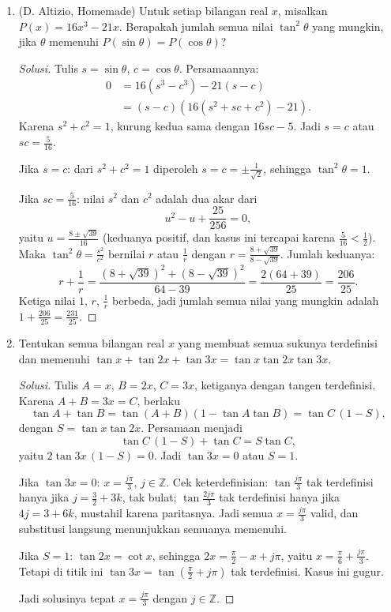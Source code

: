 \documentclass[12pt]{scrartcl}
\begin{document}
\begin{enumerate}
	\item (D. Altizio, Homemade)
	Untuk setiap bilangan real $x$, misalkan $P(x) = 16x^3-21x$.
	Berapakah jumlah semua nilai $\tan^2\theta$ yang mungkin, jika $\theta$
	memenuhi $P(\sin\theta) = P(\cos\theta)$?
	\begin{proof}[Solusi]
	Tulis $s = \sin\theta$, $c = \cos\theta$. Persamaannya:
	\begin{align*}
	0 &= 16(s^3-c^3) - 21(s-c) \\
	&= (s-c)(16(s^2+sc+c^2) - 21).
	\end{align*}
	Karena $s^2+c^2 = 1$, kurung kedua sama dengan $16sc - 5$. Jadi
	$s = c$ atau $sc = \frac{5}{16}$.

	Jika $s = c$: dari $s^2+c^2 = 1$ diperoleh $s = c = \pm\frac{1}{\sqrt{2}}$,
	sehingga $\tan^2\theta = 1$.

	Jika $sc = \frac{5}{16}$: nilai $s^2$ dan $c^2$ adalah dua akar dari
	\[ u^2 - u + \frac{25}{256} = 0, \]
	yaitu $u = \frac{8\pm\sqrt{39}}{16}$ (keduanya positif, dan kasus ini
	tercapai karena $\frac{5}{16} < \frac12$). Maka $\tan^2\theta = \frac{s^2}{c^2}$
	bernilai $r$ atau $\frac1r$ dengan $r = \frac{8+\sqrt{39}}{8-\sqrt{39}}$.
	Jumlah keduanya:
	\[ r + \frac1r = \frac{(8+\sqrt{39})^2+(8-\sqrt{39})^2}{64-39}
	= \frac{2(64+39)}{25} = \frac{206}{25}. \]
	Ketiga nilai $1$, $r$, $\frac1r$ berbeda, jadi jumlah semua nilai yang
	mungkin adalah $1 + \frac{206}{25} = \frac{231}{25}$.
	\end{proof}

	\item
	Tentukan semua bilangan real $x$ yang membuat semua sukunya terdefinisi dan
	memenuhi $\tan x + \tan 2x + \tan 3x = \tan x\tan 2x\tan 3x$.
	\begin{proof}[Solusi]
	Tulis $A = x$, $B = 2x$, $C = 3x$, ketiganya dengan tangen terdefinisi.
	Karena $A+B = 3x = C$, berlaku
	\[ \tan A + \tan B = \tan(A+B)(1-\tan A\tan B) = \tan C\,(1-S), \]
	dengan $S = \tan x\tan 2x$. Persamaan menjadi
	\[ \tan C\,(1-S) + \tan C = S\tan C, \]
	yaitu $2\tan 3x\,(1-S) = 0$. Jadi $\tan 3x = 0$ atau $S = 1$.

	Jika $\tan 3x = 0$: $x = \frac{j\pi}{3}$, $j \in \mathbb{Z}$.
	Cek keterdefinisian: $\tan\frac{j\pi}{3}$ tak terdefinisi hanya jika
	$j = \frac32 + 3k$, tak bulat; $\tan\frac{2j\pi}{3}$ tak terdefinisi hanya
	jika $4j = 3+6k$, mustahil karena paritasnya. Jadi semua $x = \frac{j\pi}{3}$
	valid, dan substitusi langsung menunjukkan semuanya memenuhi.

	Jika $S = 1$: $\tan 2x = \cot x$, sehingga $2x = \frac{\pi}{2}-x+j\pi$,
	yaitu $x = \frac{\pi}{6}+\frac{j\pi}{3}$. Tetapi di titik ini
	$\tan 3x = \tan(\frac{\pi}{2}+j\pi)$ tak terdefinisi. Kasus ini gugur.

	Jadi solusinya tepat $x = \frac{j\pi}{3}$ dengan $j \in \mathbb{Z}$.
	\end{proof}

\end{enumerate}
\end{document}
